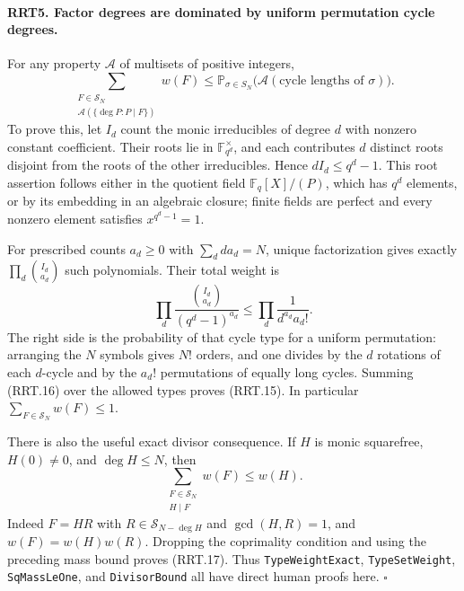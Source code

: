 \documentclass[11pt,a4paper]{article}
\numberwithin{equation}{section}
\theoremstyle{remark}\newtheorem{remark}[theorem]{Remark}
\begin{document}
\paragraph{RRT5. Factor degrees are dominated by uniform permutation cycle degrees.}
\label{claim:RRT5}
For any property $\mathcal A$ of multisets of positive integers,
\[
 \sum_{\substack{F\in\mathcal S_N\\
               \mathcal A(\{\deg P:P\mid F\})}}w(F)
 \le\mathbb P_{\sigma\in S_N}
              \bigl(\mathcal A(\text{cycle lengths of }\sigma)\bigr).
 \tag{RRT.15}
\]
To prove this, let $I_d$ count the monic irreducibles of degree
$d$ with nonzero constant coefficient.  Their roots lie in
$\mathbb F_{q^d}^\times$, and each contributes $d$ distinct roots
disjoint from the roots of the other irreducibles.  Hence
$dI_d\le q^d-1$.  This root assertion follows either in the
quotient field $\mathbb F_q[X]/(P)$, which has $q^d$ elements,
or by its embedding in an algebraic closure; finite fields are
perfect and every nonzero element satisfies $x^{q^d-1}=1$.

For prescribed counts $a_d\ge0$ with $\sum_d da_d=N$, unique
factorization gives exactly $\prod_d\binom{I_d}{a_d}$ such
polynomials.  Their total weight is
\[
 \prod_d\frac{\binom{I_d}{a_d}}{(q^d-1)^{a_d}}
       \le\prod_d\frac1{d^{a_d}a_d!}.
 \tag{RRT.16}
\]
The right side is the probability of that cycle type for a
uniform permutation: arranging the $N$ symbols gives $N!$
orders, and one divides by the $d$ rotations of each $d$-cycle
and by the $a_d!$ permutations of equally long cycles.
Summing (RRT.16) over the allowed types proves (RRT.15).
In particular $\sum_{F\in\mathcal S_N}w(F)\le1$.

There is also the useful exact divisor consequence.  If $H$ is
monic squarefree, $H(0)\ne0$, and $\deg H\le N$, then
\[
                 \sum_{\substack{F\in\mathcal S_N\\H\mid F}}w(F)
                         \le w(H).
 \tag{RRT.17}
\]
Indeed $F=HR$ with $R\in\mathcal S_{N-\deg H}$ and
$\gcd(H,\allowbreak{} R)=1$, and $w(F)=w(H)w(R)$.  Dropping the coprimality
condition and using the preceding mass bound proves (RRT.17).
Thus \texttt{Type\allowbreak Weight\allowbreak Exact}, \texttt{Type\allowbreak Set\allowbreak Weight},
\texttt{Sq\allowbreak Mass\allowbreak Le\allowbreak One}, and \texttt{Divisor\allowbreak Bound} all have direct
human proofs here.
\hfill$\square$

\end{document}
